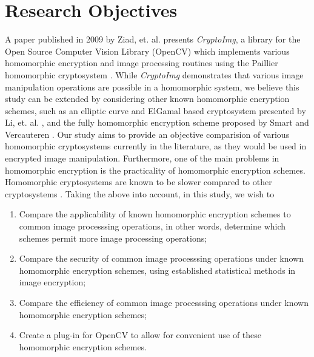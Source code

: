 \section{Research Objectives}

A paper published in 2009 by Ziad, et. al. presents \textit{CryptoImg}, a library for the  Open Source Computer Vision Library (OpenCV) \cite{opencv_library} which implements various homomorphic encryption and image processing routines using the Paillier homomorphic cryptosystem \cite{ziad_cryptoimg:_2016}. While \textit{CryptoImg} demonstrates that various image manipulation operations are possible in a homomorphic system, we believe this study can be extended by considering other known homomorphic encryption schemes, such as an elliptic curve and ElGamal based cryptosystem presented by Li, et. al. \cite{li_elliptic_2012}, and the fully homomorphic encryption scheme proposed by Smart and Vercauteren \cite{hutchison_fully_2010}. Our study aims to provide an objective comparision of various homomorphic cryptosystems currently in the literature, as they would be used in encrypted image manipulation.
Furthermore, one of the main problems in homomorphic encryption is the practicality of homomorphic encryption schemes. Homomorphic cryptosystems are known to be slower compared to other cryptosystems \cite{sen_homomorphic_2013}.
Taking the above into account, in this study, we wish to
\begin{enumerate}
    \item Compare the applicability of known homomorphic encryption schemes to common image processsing operations, in other words, determine which schemes permit more image processing operations;
		\item Compare the security of common image processsing operations under known homomorphic encryption schemes, using established statistical methods in image encryption;
    \item Compare the efficiency of common image processsing operations under known homomorphic encryption schemes;
    \item Create a plug-in for OpenCV to allow for convenient use of these homomorphic encryption schemes.
\end{enumerate}
